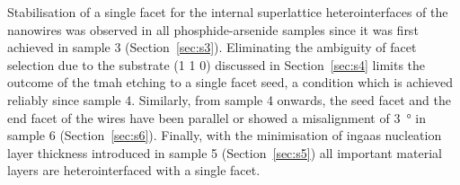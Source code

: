 Stabilisation of a single  facet for the internal superlattice heterointerfaces of the nanowires was observed in all phosphide-arsenide samples since it was first achieved in sample 3 (Section~\ref{sec:s3}). Eliminating the ambiguity of facet selection due to the substrate \hkl(1 1 0) discussed in Section~\ref{sec:s4} limits the outcome of the \acf{tmah} etching to a single facet seed, a condition which is achieved reliably since sample 4. Similarly, from sample 4 onwards, the seed facet and the end facet of the wires have been parallel or showed a misalignment of \qty{3}{\degree} in sample 6 (Section~\ref{sec:s6}). Finally, with the minimisation of \acf{ingaas} nucleation layer thickness introduced in sample 5 (Section~\ref{sec:s5}) all important material layers are heterointerfaced with a single  facet.

